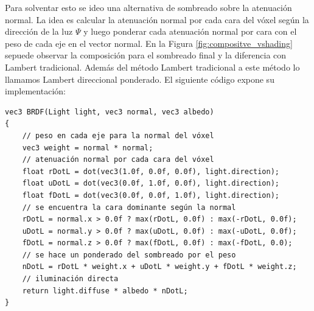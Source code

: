 Para solventar esto se ideo una alternativa de sombreado sobre la atenuación normal. La idea es calcular la atenuación normal por cada cara del vóxel según la dirección de la luz $\Psi$ y luego ponderar cada atenuación normal por cara con el peso de cada eje en el vector normal. En la Figura \ref{fig:compositve_vshading} sepuede observar la composición para el sombreado final y la diferencia con Lambert tradicional. Además del método Lambert tradicional a este método lo llamamos Lambert direccional ponderado. El siguiente código expone su implementación:
\\
\begin{lstlisting}[caption={Sombreado direccional y ponderado según la normal para un vóxel}, label=Shading2]
vec3 BRDF(Light light, vec3 normal, vec3 albedo)
{
	// peso en cada eje para la normal del vóxel
    vec3 weight = normal * normal;
    // atenuación normal por cada cara del vóxel
    float rDotL = dot(vec3(1.0f, 0.0f, 0.0f), light.direction);
    float uDotL = dot(vec3(0.0f, 1.0f, 0.0f), light.direction);
    float fDotL = dot(vec3(0.0f, 0.0f, 1.0f), light.direction);
    // se encuentra la cara dominante según la normal
    rDotL = normal.x > 0.0f ? max(rDotL, 0.0f) : max(-rDotL, 0.0f);
    uDotL = normal.y > 0.0f ? max(uDotL, 0.0f) : max(-uDotL, 0.0f);
    fDotL = normal.z > 0.0f ? max(fDotL, 0.0f) : max(-fDotL, 0.0);
    // se hace un ponderado del sombreado por el peso
    nDotL = rDotL * weight.x + uDotL * weight.y + fDotL * weight.z;
    // iluminación directa
    return light.diffuse * albedo * nDotL;
}
\end{lstlisting}

